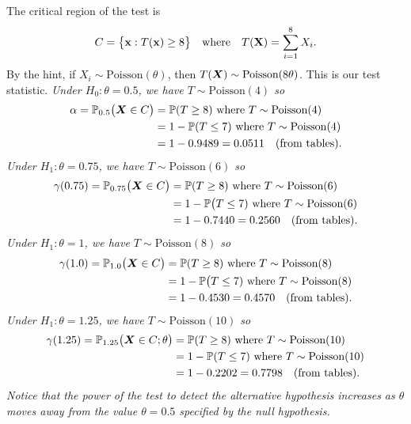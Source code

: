 \begin{solution}
The critical region of the test is 
\[
C = \big\{\mathbf{x} : T(\mathbf{x}) \geq 8\big\}
\text{\quad where\quad}
T(\mathbf{X}) = \sum_{i=1}^8 X_i.
\]
By the hint, if $X_i\sim\text{Poisson}(\theta)$, then $T(\boldsymbol{X})\sim\text{Poisson}(8\theta)$. This is our test statistic.
\ben
\it %
Under $H_0:\theta=0.5$, we have $T\sim\text{Poisson}(4)$ so
\begin{align*}
\alpha	= \mathbb{P}_{0.5}\big(\boldsymbol{X}\in C\big) 
		& = \mathbb{P}(T\geq 8) \text{ where } T\sim\text{Poisson}(4) \\
		& = 1 - \mathbb{P}(T\leq 7) \text{ where } T\sim\text{Poisson}(4) \\
		& = 1 - 0.9489 = 0.0511 \quad\text{(from tables).}
\end{align*}
\it %
Under $H_1:\theta=0.75$, we have $T\sim\text{Poisson}(6)$ so
\begin{align*}
\gamma(0.75) = \mathbb{P}_{0.75}\big(\boldsymbol{X}\in C\big) 
			& = \mathbb{P}(T\geq 8)\text{ where }T\sim\text{Poisson}(6) \\
			& = 1 - \mathbb{P}\big(T\leq 7)\text{ where }T\sim\text{Poisson}(6) \\
			& = 1 - 0.7440 = 0.2560 \quad\text{(from tables).}
\end{align*}
Under $H_1:\theta=1$, we have $T\sim\text{Poisson}(8)$ so
\begin{align*}
\gamma(1.0)	= \mathbb{P}_{1.0}\big(\boldsymbol{X}\in C\big) 
			& = \mathbb{P}(T\geq 8)\text{ where }T\sim\text{Poisson}(8) \\
			& = 1 - \mathbb{P}\big(T\leq 7)\text{ where } T\sim\text{Poisson}(8) \\
			& = 1 - 0.4530 = 0.4570 \quad\text{(from tables).}
\end{align*}
Under $H_1:\theta=1.25$, we have $T\sim\text{Poisson}(10)$ so
\begin{align*}
\gamma(1.25) = \mathbb{P}_{1.25}\big(\boldsymbol{X}\in C;\theta\big)
			& = \mathbb{P}(T\geq 8)\text{ where } T\sim\text{Poisson}(10) \\
			& = 1 - \mathbb{P}(T\leq 7)\text{ where } T\sim\text{Poisson}(10) \\
			& = 1 - 0.2202 = 0.7798 \quad\text{(from tables).}
\end{align*}
Notice that the power of the test to detect the alternative hypothesis \emph{increases} as $\theta$ moves away from the value $\theta=0.5$ specified by the null hypothesis.
\een
\end{solution}


